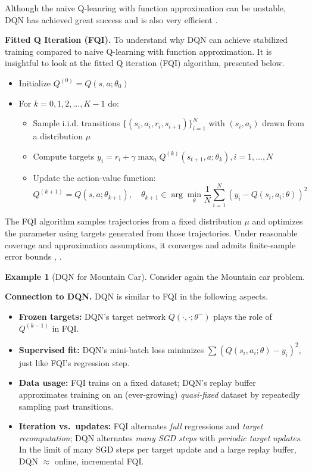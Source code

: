 \documentclass[
]{book}
\providecommand{\tightlist}{%
  \setlength{\itemsep}{0pt}\setlength{\parskip}{0pt}}
\theoremstyle{definition}
\theoremstyle{definition}
\newtheorem{example}{Example}[chapter]
\theoremstyle{definition}
\theoremstyle{definition}
\theoremstyle{remark}
\begin{document}
Although the naive Q-leanring with function approximation can be unstable, DQN has achieved great success and is also very efficient \citep{mnih2015human}.

\textbf{Fitted Q Iteration (FQI).} To understand why DQN can achieve stabilized training compared to naive Q-learning with function approximation. It is insightful to look at the fitted Q iteration (FQI) algorithm, presented below.

\begin{itemize}
\tightlist
\item
  Initialize \(Q^{(0)} = Q(s,a;\theta_0)\)
\item
  For \(k=0,1,2,\dots,K-1\) do:

  \begin{itemize}
  \tightlist
  \item
    Sample i.i.d. transitions \(\{ (s_i,a_i,r_i,s_{i+1}) \}_{i=1}^N\) with \((s_i, a_i)\) drawn from a distribution \(\mu\)
  \item
    Compute targets \(y_i = r_i + \gamma \max_a Q^{(k)}(s_{t+1},a;\theta_k),i=1,\dots,N\)
  \item
    Update the action-value function:
    \[
    Q^{(k+1)} = Q(s,a;\theta_{k+1}), \quad \theta_{k+1} \in \arg\min_{\theta}  \frac{1}{N} \sum_{i=1}^N (y_i - Q(s_i,a_i;\theta))^2
    \]
  \end{itemize}
\end{itemize}

The FQI algorithm samples trajectories from a fixed distribution \(\mu\) and optimizes the parameter using targets generated from those trajectories. Under reasonable coverage and approximation assumptions, it converges and admits finite-sample error bounds \citep{antos2007fitted}, \citep{munos2008finite}.

\begin{example}[DQN for Mountain Car]
\protect\hypertarget{exm:MountainCarQLearningFA}{}\label{exm:MountainCarQLearningFA}Consider again the Mountain car problem.
\end{example}

\textbf{Connection to DQN.} DQN is similar to FQI in the following aspects.

\begin{itemize}
\item
  \textbf{Frozen targets:} DQN's target network \(Q(\cdot,\cdot; \theta^-)\) plays the role of \(Q^{(k-1)}\) in FQI.
\item
  \textbf{Supervised fit:} DQN's mini-batch loss minimizes \(\sum (Q(s_i,a_i; \theta) - y_i)^2\), just like FQI's regression step.
\item
  \textbf{Data usage:} FQI trains on a fixed dataset; DQN's replay buffer approximates training on an (ever-growing) \emph{quasi-fixed} dataset by repeatedly sampling past transitions.
\item
  \textbf{Iteration vs.~updates:} FQI alternates \emph{full} regressions and \emph{target recomputation}; DQN alternates \emph{many SGD steps} with \emph{periodic target updates}. In the limit of many SGD steps per target update and a large replay buffer, DQN \(\approx\) online, incremental FQI.
\end{itemize}
\end{document}

